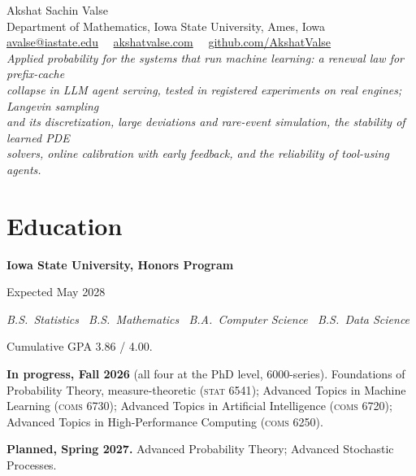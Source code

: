\documentclass[11pt]{article}
\newcommand{\entry}[2]{%
  \noindent\begin{minipage}[t]{0.78\textwidth}\raggedright\textbf{#1}\end{minipage}%
  \hfill%
  \begin{minipage}[t]{0.22\textwidth}\raggedleft #2\end{minipage}\par\vspace{0.1em}}
\newcommand{\subentry}[1]{\noindent\textit{#1}\par\vspace{0.15em}}
\newcommand{\course}[2]{#1 (\textsc{#2})}
\begin{document}
\begin{center}
  {\LARGE Akshat Sachin Valse}\\[0.5em]
  {\small
    Department of Mathematics, Iowa State University, Ames, Iowa\\
    \href{mailto:avalse@iastate.edu}{avalse@iastate.edu}
    \ \textperiodcentered\ \href{https://akshatvalse.com}{akshatvalse.com}
    \ \textperiodcentered\ \href{https://github.com/AkshatValse}{github.com/AkshatValse}
  }\\[0.6em]
  {\small\itshape Applied probability for the systems that run machine learning: a renewal
  law for prefix-cache\\ collapse in LLM agent serving, tested in registered experiments on
  real engines; Langevin sampling\\ and its discretization, large deviations and rare-event
  simulation, the stability of learned PDE\\ solvers, online calibration with early feedback,
  and the reliability of tool-using agents.}
\end{center}

\section{Education}

\entry{Iowa State University, Honors Program}{Expected May 2028}
\subentry{B.S.\ Statistics \textperiodcentered\ B.S.\ Mathematics \textperiodcentered\
B.A.\ Computer Science \textperiodcentered\ B.S.\ Data Science}
\noindent Cumulative GPA 3.86 / 4.00.

\vspace{0.5em}
\noindent\textbf{In progress, Fall 2026} (all four at the PhD level, 6000-series).
\course{Foundations of Probability Theory, measure-theoretic}{stat 6541};
\course{Advanced Topics in Machine Learning}{coms 6730};
\course{Advanced Topics in Artificial Intelligence}{coms 6720};
\course{Advanced Topics in High-Performance Computing}{coms 6250}.

\vspace{0.35em}
\noindent\textbf{Planned, Spring 2027.} Advanced Probability Theory; Advanced Stochastic
Processes.
\end{document}
